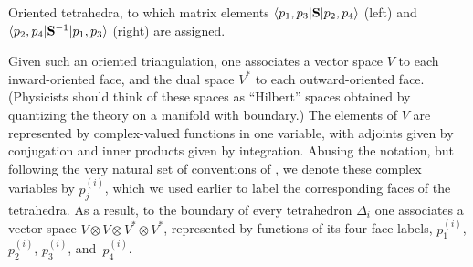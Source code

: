 \documentclass[hyper]{JHEP3}
\begin{document}
%
{\small Oriented tetrahedra, to which matrix elements
$\langle p_1,p_3|{\bf S}|p_2,p_4\rangle$ (left) and
$\langle p_2,p_4|{\bf S}^{-1}|p_1,p_3\rangle$ (right) are assigned.
\label{fig:tetr_momenta} }

Given such an oriented triangulation, one associates a vector space $V$
to each inward-oriented face, and the dual space $V^*$ to each outward-oriented face.
(Physicists should think of these spaces as ``Hilbert'' spaces obtained
by quantizing the theory on a manifold with boundary.)
The elements of $V$ are represented by complex-valued functions in one variable,
with adjoints given by conjugation and inner products given by integration.
Abusing the notation, but following the very natural set of conventions of \cite{hikami-2001-16, hikami-2006},
we denote these complex variables by $p_j^{(i)}$,
which we used earlier to label the corresponding faces of the tetrahedra.
As a result, to the boundary of every tetrahedron $\Delta_i$ one associates a vector space
$V\otimes V\otimes V^* \otimes V^*$, represented by functions of its four face labels,
$p_1^{(i)}$, $p_2^{(i)}$, $p_3^{(i)}$, and~$p_4^{(i)}$.
\end{document}
